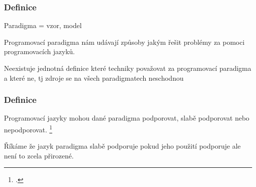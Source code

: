 

\begin{frame}
    \frametitle{Definice}
    Paradigma = vzor, model

    Programovací paradigma nám udávají způsoby jakým řešit problémy za pomoci programovacích jazyků.

    Neexistuje jednotná definice které techniky považovat za programovací paradigma a které ne, tj zdroje se na všech paradigmatech neschodnou
\end{frame}


\begin{frame}
    \frametitle{Definice}
    Programovací jazyky mohou dané paradigma podporovat, slabě podporovat nebo nepodporovat. \footcite{paradigms_of_programming}
    
    Říkáme že jazyk paradigma slabě podporuje pokud jeho použití podporuje ale není to zcela přirozené.
\end{frame}
